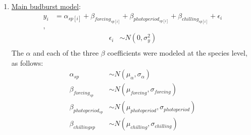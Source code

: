 \documentclass{article}
\begin{document}
\begin{enumerate}
\item \underline{Main budburst model}:
\begin{align*}
y_i &= \alpha_{sp[i]} + \beta_{forcing_{sp[i]}} + \beta_{photoperiod_{sp[i]}} + \beta_{chilling_{sp[i]}} + \epsilon_i\\,
\end{align*}
\begin{align*}
\epsilon_i & \sim N(0,\sigma^2_y) \\
\end{align*}
\noindent The $\alpha$ and each of the three $\beta$ coefficients were modeled at the species level, as follows:
\begin{align*}
\alpha_{sp} & \sim N(\mu_{\alpha}, \sigma_{\alpha}) \\
\beta_{forcing_{sp}} & \sim N(\mu_{forcing}, \sigma_{forcing}) \\
\beta_{photoperiod_{sp}} & \sim N(\mu_{photoperiod}, \sigma_{photoperiod})\\
\beta_{chilling{sp}} & \sim N(\mu_{chilling}, \sigma_{chilling})
\end{align*}


\end{enumerate}
\end{document}
